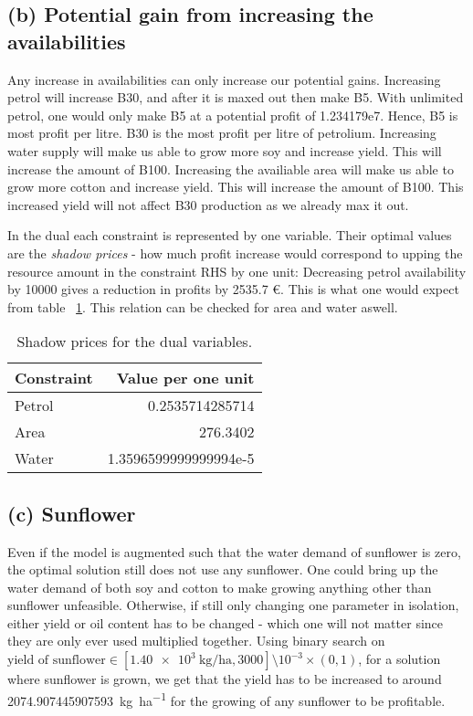 \documentclass{article}
\begin{document}
\subsection{(b) Potential gain from increasing the availabilities}
Any increase in availabilities can only increase our potential gains.
Increasing petrol will increase B30, and after it is maxed out then make B5.
With unlimited petrol, one would only make B5 at a potential profit of 1.234179e7.
Hence, B5 is most profit per litre.
B30 is the most profit per litre of petrolium.
Increasing water supply will make us able to grow more soy and increase yield.
This will increase the amount of B100.
Increasing the availiable area will make us able to grow more cotton and increase yield.
This will increase the amount of B100.
This increased yield will not affect B30 production as we already max it out.

In the dual each constraint is represented by one variable.
Their optimal values are the \emph{shadow prices} -
how much profit increase would correspond to upping the resource amount
in the constraint RHS by one unit:
Decreasing petrol availability by \num{10000} gives a reduction in profits by \num{2535.7} \euro. 
This is what one would expect from table ~\ref{tab:shadowprices}.
This relation can be checked for area and water aswell. 

\begin{table}
	\centering
	\caption{Shadow prices for the dual variables. \label{tab:shadowprices}}
	\begin{tabular}{l r}
		\toprule
		Constraint & Value per one unit \\
		\midrule
		Petrol & 0.2535714285714 \\
		Area & 276.3402 \\
		Water & 1.3596599999999994e-5 \\
		\bottomrule
	\end{tabular}
\end{table}

\subsection{(c) Sunflower}
Even if the model is augmented such that
the water demand of sunflower is zero,
the optimal solution still does not use any sunflower.
One could bring up the water demand of both soy and cotton
to make growing anything other than sunflower unfeasible.
Otherwise, if still only changing one parameter in isolation,
either yield or oil content has to be changed -
which one will not matter since they are only ever used multiplied together.
Using binary search on
$\text{yield of sunflower} \in [\SI{1.40e3}{\kilo\gram\per\hectare}, 3000] \setminus 10^{-3} \times (0, 1)$,
for a solution where sunflower is grown,
we get that the yield has to be increased to around \SI[round-precision=6]{2074.907445907593}{\kilo\gram\per\hectare}
for the growing of any sunflower to be profitable.
\end{document}
